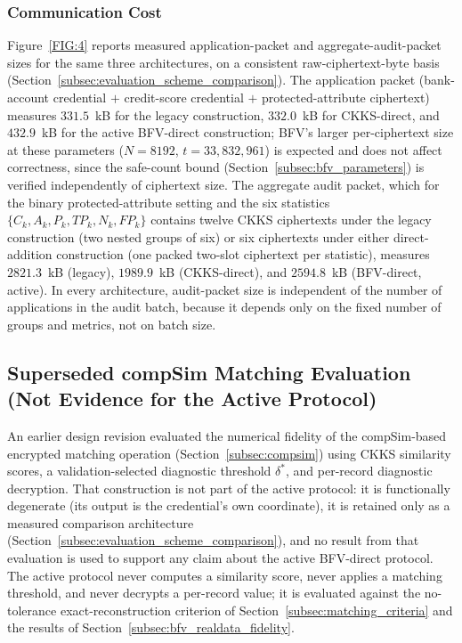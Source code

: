 \documentclass[a4paper,fleqn]{cas-dc}
\begin{document}
\subsubsection{Communication Cost}
Figure~\ref{FIG:4} reports measured application-packet and aggregate-audit-packet sizes for the same three architectures, on a consistent raw-ciphertext-byte basis (Section~\ref{subsec:evaluation_scheme_comparison}). The application packet (bank-account credential $+$ credit-score credential $+$ protected-attribute ciphertext) measures $331.5$~kB for the legacy construction, $332.0$~kB for CKKS-direct, and $432.9$~kB for the active BFV-direct construction; BFV's larger per-ciphertext size at these parameters ($N=8192$, $t=33{,}832{,}961$) is expected and does not affect correctness, since the safe-count bound (Section~\ref{subsec:bfv_parameters}) is verified independently of ciphertext size. The aggregate audit packet, which for the binary protected-attribute setting and the six statistics $\{C_k,A_k,P_k,TP_k,N_k,FP_k\}$ contains twelve CKKS ciphertexts under the legacy construction (two nested groups of six) or six ciphertexts under either direct-addition construction (one packed two-slot ciphertext per statistic), measures $2821.3$~kB (legacy), $1989.9$~kB (CKKS-direct), and $2594.8$~kB (BFV-direct, active). In every architecture, audit-packet size is independent of the number of applications in the audit batch, because it depends only on the fixed number of groups and metrics, not on batch size.




\subsection{Superseded compSim Matching Evaluation (Not Evidence for the Active Protocol)}
\label{subsec:gender_matching}

An earlier design revision evaluated the numerical fidelity of the \textsf{compSim}-based encrypted matching operation (Section~\ref{subsec:compsim}) using CKKS similarity scores, a validation-selected diagnostic threshold $\delta^{*}$, and per-record diagnostic decryption. That construction is not part of the active protocol: it is functionally degenerate (its output is the credential's own coordinate), it is retained only as a measured comparison architecture (Section~\ref{subsec:evaluation_scheme_comparison}), and no result from that evaluation is used to support any claim about the active BFV-direct protocol. The active protocol never computes a similarity score, never applies a matching threshold, and never decrypts a per-record value; it is evaluated against the no-tolerance exact-reconstruction criterion of Section~\ref{subsec:matching_criteria} and the results of Section~\ref{subsec:bfv_realdata_fidelity}.
\end{document}
